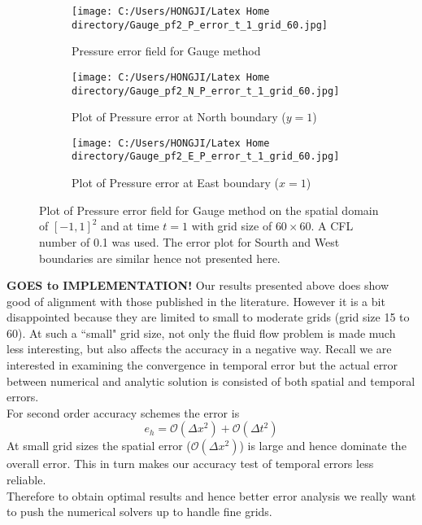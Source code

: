 \begin{figure}[H]
	\centering
	\begin{subfigure}[t]{2.5in}
		\centering
		\texttt{[image: C:/Users/HONGJI/Latex Home directory/Gauge\_pf2\_P\_error\_t\_1\_grid\_60.jpg]}
		\caption{Pressure error field for Gauge method}\label{fig:6.12a}		
	\end{subfigure}
	\quad
	\begin{subfigure}[t]{2.5in}
		\centering
		\texttt{[image: C:/Users/HONGJI/Latex Home directory/Gauge\_pf2\_N\_P\_error\_t\_1\_grid\_60.jpg]}
		\caption{Plot of Pressure error at North boundary ($y=1$)}\label{fig:6.12b}
	\end{subfigure}
	\quad
	\begin{subfigure}[t]{2.5in}
		\centering
		\texttt{[image: C:/Users/HONGJI/Latex Home directory/Gauge\_pf2\_E\_P\_error\_t\_1\_grid\_60.jpg]}
		\caption{Plot of Pressure error at East boundary ($x=1$)}\label{fig:6.12c}
	\end{subfigure}
	\caption{Plot of Pressure error field for Gauge method on the spatial domain of $[-1,1]^2$ and at time $t=1$ with grid size of $60 \times 60$. A CFL number of 0.1 was used. The error plot for Sourth and West boundaries are similar hence not presented here.}\label{fig:6.12}
\end{figure}

\textbf{GOES to IMPLEMENTATION!}
\newpage
Our results presented above does show good of alignment with those published in the literature. However it is a bit disappointed because they are limited to small to moderate grids (grid size 15 to 60). At such a ``small" grid size, not only the fluid flow problem is made much less interesting, but also affects the accuracy in a negative way. Recall we are interested in examining the convergence in temporal error but the actual error between numerical and analytic solution is consisted of both spatial and temporal errors. \\
For second order accuracy schemes the error is
\begin{equation}
e_h = \mathcal{O}(\Delta x^2) + \mathcal{O}(\Delta t^2)
\end{equation}
At small grid sizes the spatial error ($\mathcal{O}(\Delta x^2)$) is large and hence dominate the overall error. This in turn makes our accuracy test of temporal errors less reliable.\\ Therefore to obtain optimal results and hence better error analysis we really want to push the numerical solvers up to handle fine grids.\\

